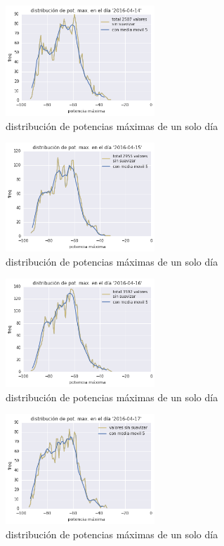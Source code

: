 \documentclass[12pt]{article}
\begin{document}
\begin{figure}[H] 
  \centering
  \includegraphics[width=0.5\textwidth]{../pot_max_2016-04-14.png}
  \caption{distribución de potencias máximas de un solo día}
\end{figure}

\begin{figure}[H] 
  \centering
  \includegraphics[width=0.5\textwidth]{../pot_max_2016-04-15.png}
  \caption{distribución de potencias máximas de un solo día}
\end{figure}

\begin{figure}[H] 
  \centering
  \includegraphics[width=0.5\textwidth]{../pot_max_2016-04-16.png}
  \caption{distribución de potencias máximas de un solo día}
\end{figure}

\begin{figure}[H] 
  \centering
  \includegraphics[width=0.5\textwidth]{../pot_max_2016-04-17.png}
  \caption{distribución de potencias máximas de un solo día}
\end{figure}
\end{document}
